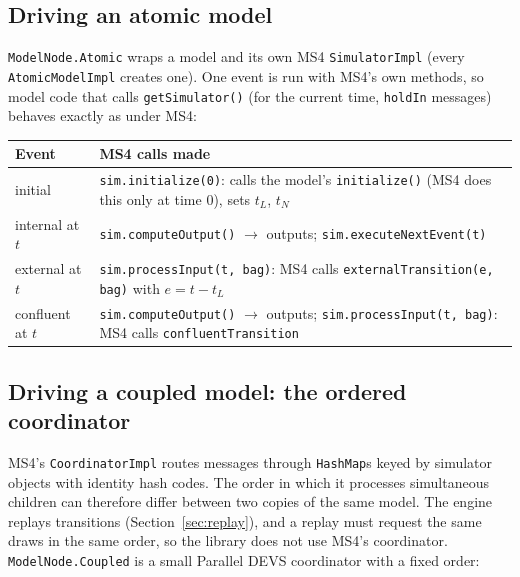 \documentclass[11pt]{article}
\newcommand{\code}[1]{\texttt{#1}}
\begin{document}
\subsection{Driving an atomic model}
\code{ModelNode.Atomic} wraps a model and its own MS4 \code{SimulatorImpl} (every \code{AtomicModelImpl} creates one).
One event is run with MS4's own methods, so model code that calls \code{getSimulator()} (for the current time,
\code{holdIn} messages) behaves exactly as under MS4:
\begin{center}
\small
\begin{tabularx}{\linewidth}{@{}p{2.7cm} Y@{}}
\toprule
\textbf{Event} & \textbf{MS4 calls made}\\
\midrule
initial & \code{sim.initialize(0)}: calls the model's \code{initialize()} (MS4 does this only at time 0), sets $t_L$, $t_N$\\
internal at $t$ & \code{sim.computeOutput()} $\to$ outputs; \code{sim.executeNextEvent(t)}\\
external at $t$ & \code{sim.processInput(t, bag)}: MS4 calls \code{externalTransition(e, bag)} with $e = t - t_L$\\
confluent at $t$ & \code{sim.computeOutput()} $\to$ outputs; \code{sim.processInput(t, bag)}: MS4 calls \code{confluentTransition}\\
\bottomrule
\end{tabularx}
\end{center}

\subsection{Driving a coupled model: the ordered coordinator}
MS4's \code{CoordinatorImpl} routes messages through \code{HashMap}s keyed by simulator objects with identity hash
codes. The order in which it processes simultaneous children can therefore differ between two copies of the same
model. The engine replays transitions (Section~\ref{sec:replay}), and a replay must request the same draws in the same
order, so the library does not use MS4's coordinator. \code{ModelNode.Coupled} is a small Parallel DEVS coordinator
with a fixed order:
\end{document}
